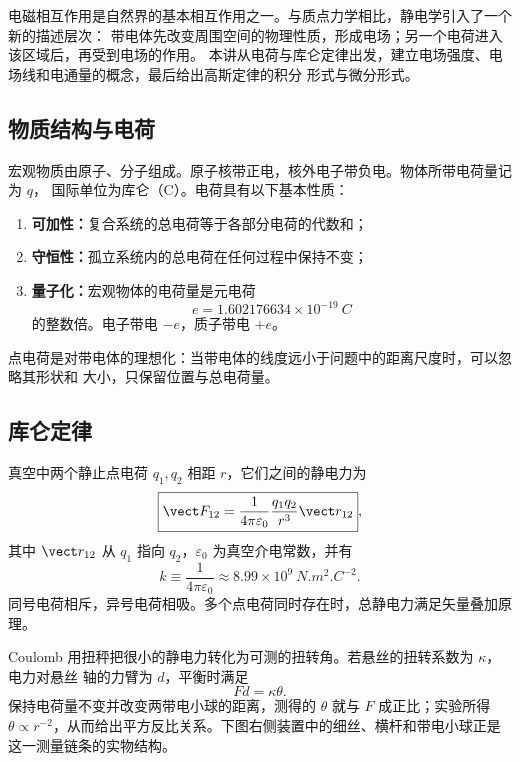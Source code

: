 电磁相互作用是自然界的基本相互作用之一。与质点力学相比，静电学引入了一个新的描述层次：
带电体先改变周围空间的物理性质，形成电场；另一个电荷进入该区域后，再受到电场的作用。
本讲从电荷与库仑定律出发，建立电场强度、电场线和电通量的概念，最后给出高斯定律的积分
形式与微分形式。

\subsection*{物质结构与电荷}

宏观物质由原子、分子组成。原子核带正电，核外电子带负电。物体所带电荷量记为 $q$，
国际单位为库仑（\si{C}）。电荷具有以下基本性质：
\begin{enumerate}[label=\arabic*.,leftmargin=2em]
  \item \textbf{可加性：}复合系统的总电荷等于各部分电荷的代数和；
  \item \textbf{守恒性：}孤立系统内的总电荷在任何过程中保持不变；
  \item \textbf{量子化：}宏观物体的电荷量是元电荷
  \begin{equation}
    e=1.602176634\times10^{-19}\ \si{C}
  \end{equation}
  的整数倍。电子带电 $-e$，质子带电 $+e$。
\end{enumerate}

\matterStructureDiagram

点电荷是对带电体的理想化：当带电体的线度远小于问题中的距离尺度时，可以忽略其形状和
大小，只保留位置与总电荷量。

\subsection*{库仑定律}

真空中两个静止点电荷 $q_1,q_2$ 相距 $r$，它们之间的静电力为
\begin{equation}
  \boxed{\vect F_{12}=
  \frac{1}{4\pi\varepsilon_0}\frac{q_1q_2}{r^3}\vect r_{12}},
\end{equation}
其中 $\vect r_{12}$ 从 $q_1$ 指向 $q_2$，$\varepsilon_0$ 为真空介电常数，并有
\begin{equation}
  k\equiv\frac{1}{4\pi\varepsilon_0}
  \approx8.99\times10^9\ \si{N.m^2.C^{-2}}.
\end{equation}
同号电荷相斥，异号电荷相吸。多个点电荷同时存在时，总静电力满足矢量叠加原理。

\coulombDiagram

Coulomb 用扭秤把很小的静电力转化为可测的扭转角。若悬丝的扭转系数为 $\kappa$，电力对悬丝
轴的力臂为 $d$，平衡时满足
\begin{equation}Fd=\kappa\theta.\end{equation}
保持电荷量不变并改变两带电小球的距离，测得的 $\theta$ 就与 $F$ 成正比；实验所得
$\theta\propto r^{-2}$，从而给出平方反比关系。下图右侧装置中的细丝、横杆和带电小球正是
这一测量链条的实物结构。


